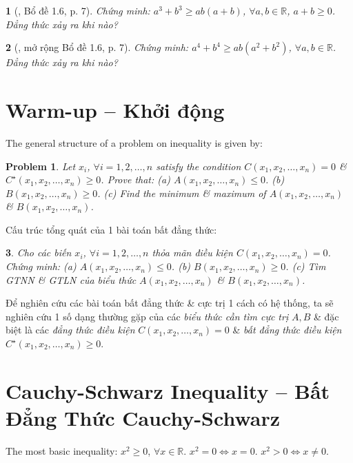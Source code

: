 \documentclass{article}
\newtheorem{baitoan}{}
\newtheorem{problem}{Problem}
\begin{document}
\begin{baitoan}[\cite{Son_Nghiep_Trung_Can_bdt}, Bổ đề 1.6, p. 7]
	Chứng minh: $a^3 + b^3\ge ab(a + b)$, $\forall a,b\in\mathbb{R}$, $a + b\ge 0$. Đẳng thức xảy ra khi nào?
\end{baitoan}

\begin{baitoan}[\cite{Son_Nghiep_Trung_Can_bdt}, mở rộng Bổ đề 1.6, p. 7]
	Chứng minh: $a^4 + b^4\ge ab(a^2 + b^2)$, $\forall a,b\in\mathbb{R}$. Đẳng thức xảy ra khi nào?
\end{baitoan}


\section{Warm-up -- Khởi động}
The general structure of a problem on inequality is given by:

\begin{problem}
	Let $x_i$, $\forall i = 1,2,\ldots,n$ satisfy the condition $C(x_1,x_2,\ldots,x_n) = 0$ \& $C^\star(x_1,x_2,\ldots,x_n)\ge0$. Prove that: (a) $A(x_1,x_2,\ldots,x_n)\le0$. (b) $B(x_1,x_2,\ldots,x_n)\ge0$. (c) Find the minimum \& maximum of $A(x_1,x_2,\ldots,x_n)$ \& $B(x_1,x_2,\ldots,x_n)$.
\end{problem}
Cấu trúc tổng quát của 1 bài toán bất đẳng thức:

\begin{baitoan}
	Cho các biến $x_i$, $\forall i = 1,2,\ldots,n$ thỏa mãn điều kiện $C(x_1,x_2,\ldots,x_n) = 0$. Chứng minh: (a) $A(x_1,x_2,\ldots,x_n)\le0$. (b) $B(x_1,x_2,\ldots,x_n)\ge0$. (c) Tìm {\rm GTNN} \& {\rm GTLN} của biểu thức $A(x_1,x_2,\ldots,x_n)$ \& $B(x_1,x_2,\ldots,x_n)$.
\end{baitoan}
Để nghiên cứu các bài toán bất đẳng thức \& cực trị 1 cách có hệ thống, ta sẽ nghiên cứu 1 số dạng thường gặp của các \textit{biểu thức cần tìm cực trị} $A,B$ \& đặc biệt là các \textit{đẳng thức điều kiện} $C(x_1,x_2,\ldots,x_n) = 0$ \& \textit{bất đẳng thức điều kiện} $C^\star(x_1,x_2,\ldots,x_n)\ge0$.


\section{Cauchy-Schwarz Inequality -- Bất Đẳng Thức Cauchy-Schwarz}
The most basic inequality: $x^2\ge0$, $\forall x\in\mathbb{R}$. $x^2 = 0\Leftrightarrow x = 0$. $x^2 > 0\Leftrightarrow x\ne0$.
\end{document}
